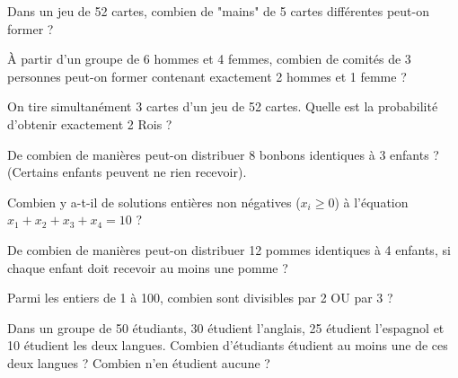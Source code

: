 \begin{exercicebox}
Dans un jeu de 52 cartes, combien de "mains" de 5 cartes différentes peut-on former ?
\end{exercicebox}

\begin{exercicebox}
À partir d'un groupe de 6 hommes et 4 femmes, combien de comités de 3 personnes peut-on former contenant exactement 2 hommes et 1 femme ?
\end{exercicebox}

\begin{exercicebox}
On tire simultanément 3 cartes d'un jeu de 52 cartes. Quelle est la probabilité d'obtenir exactement 2 Rois ?
\end{exercicebox}


\begin{exercicebox}
De combien de manières peut-on distribuer 8 bonbons identiques à 3 enfants ? (Certains enfants peuvent ne rien recevoir).
\end{exercicebox}

\begin{exercicebox}
Combien y a-t-il de solutions entières non négatives ($x_i \ge 0$) à l'équation $x_1 + x_2 + x_3 + x_4 = 10$ ?
\end{exercicebox}

\begin{exercicebox}
De combien de manières peut-on distribuer 12 pommes identiques à 4 enfants, si chaque enfant doit recevoir au moins une pomme ?
\end{exercicebox}


\begin{exercicebox}
Parmi les entiers de 1 à 100, combien sont divisibles par 2 OU par 3 ?
\end{exercicebox}

\begin{exercicebox}
Dans un groupe de 50 étudiants, 30 étudient l'anglais, 25 étudient l'espagnol et 10 étudient les deux langues. Combien d'étudiants étudient au moins une de ces deux langues ? Combien n'en étudient aucune ?
\end{exercicebox}

